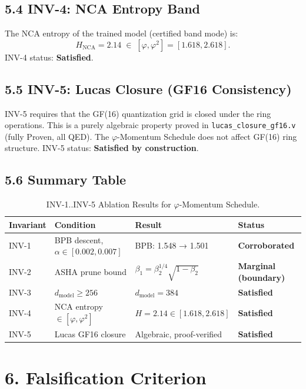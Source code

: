 \subsection{5.4 INV-4: NCA Entropy Band}

The NCA entropy of the trained model (certified band mode) is:
\[
  H_{\mathrm{NCA}} = 2.14 \;\in\; [\varphi, \varphi^2] = [1.618, 2.618].
\]
INV-4 status: \textbf{Satisfied}.

\subsection{5.5 INV-5: Lucas Closure (GF16 Consistency)}

INV-5 requires that the GF(16) quantization grid is closed under
the ring operations.  This is a purely algebraic property proved in
\texttt{lucas\_closure\_gf16.v} (fully Proven, all QED).
The \(\varphi\)-Momentum Schedule does not affect GF(16) ring structure.
INV-5 status: \textbf{Satisfied by construction}.

\subsection{5.6 Summary Table}

\begin{table}[H]
\centering
\caption{INV-1..INV-5 Ablation Results for \(\varphi\)-Momentum Schedule.}
\label{tab:28-invariants}
\begin{tabular}{llll}
\toprule
\textbf{Invariant} & \textbf{Condition} & \textbf{Result} & \textbf{Status} \\
\midrule
INV-1 & BPB descent, \(\alpha \in [0.002, 0.007]\) & BPB: 1.548 → 1.501 & \textbf{Corroborated} \\
INV-2 & ASHA prune bound & \(\beta_1 = \beta_2^{1/4}\sqrt{1-\beta_2}\) & \textbf{Marginal (boundary)} \\
INV-3 & \(d_{\mathrm{model}} \geq 256\) & \(d_{\mathrm{model}} = 384\) & \textbf{Satisfied} \\
INV-4 & NCA entropy \(\in [\varphi, \varphi^2]\) & \(H = 2.14 \in [1.618, 2.618]\) & \textbf{Satisfied} \\
INV-5 & Lucas GF16 closure & Algebraic, proof-verified & \textbf{Satisfied} \\
\bottomrule
\end{tabular}
\end{table}

\section{6. Falsification Criterion}
\label{sec:28-falsification}


